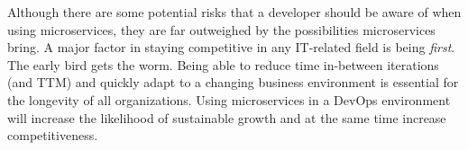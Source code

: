 \documentclass[a4paper]{article}
\begin{document}
Although there are some potential risks that a developer should be aware of when using microservices, they are far outweighed by the possibilities microservices bring. A major factor in staying competitive in any IT-related field is being \textit{first}. The early bird gets the worm. Being able to reduce time in-between iterations (and TTM) and quickly adapt to a changing business environment is essential for the longevity of all organizations. Using microservices in a DevOps environment will increase the likelihood of sustainable growth and at the same time increase competitiveness.


\newpage
\printbibliography
\end{document}

